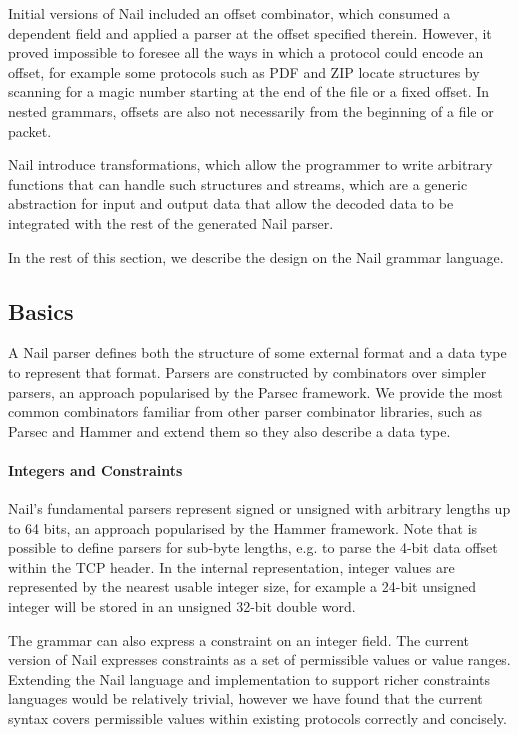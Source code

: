 Initial versions of Nail included an offset combinator, which consumed a dependent field and applied
a parser at the offset specified therein. However, it proved impossible to foresee all the ways in which a protocol could encode an offset, for example
some protocols such as PDF and ZIP locate structures by scanning for a magic number starting at the
end of the file or a fixed offset. In nested grammars, offsets are also not necessarily from
the beginning of a file or packet.

Nail introduce transformations, which allow the programmer to write arbitrary functions that can
handle such structures and streams, which are a generic abstraction for input and output data that
allow the decoded data to be integrated with the rest of the generated Nail parser.

In the rest of this section, we describe the design on the Nail grammar language.

\subsection{Basics}
A Nail parser defines both the structure of some external format and a data type to represent that
format. Parsers are constructed by combinators over simpler parsers, an approach popularised by the Parsec
framework\cite{LeijenMeijer:parsec}. We provide the most common combinators familiar from other parser
 combinator libraries, such as Parsec and Hammer\cite{hammer-parser} and extend them so they also
 describe a data type. 
\paragraph{Integers and Constraints}

Nail's fundamental parsers represent signed or unsigned with arbitrary lengths up to 64 bits, an
approach popularised by the Hammer framework.\cite{hammer-parser}  
Note that is possible to define parsers for sub-byte lengths, e.g. to parse the 4-bit
data offset within the TCP header.  In the internal representation, integer values are represented
by the nearest usable integer size, for example a 24-bit unsigned integer will be stored in an
unsigned 32-bit double word.

The grammar can also express a constraint on an integer field. The current version of Nail expresses
constraints as a set of permissible values or value ranges. Extending the Nail language and
implementation to support richer constraints languages would be relatively trivial, however we have
found that the current syntax covers permissible values within existing protocols correctly and
concisely.

